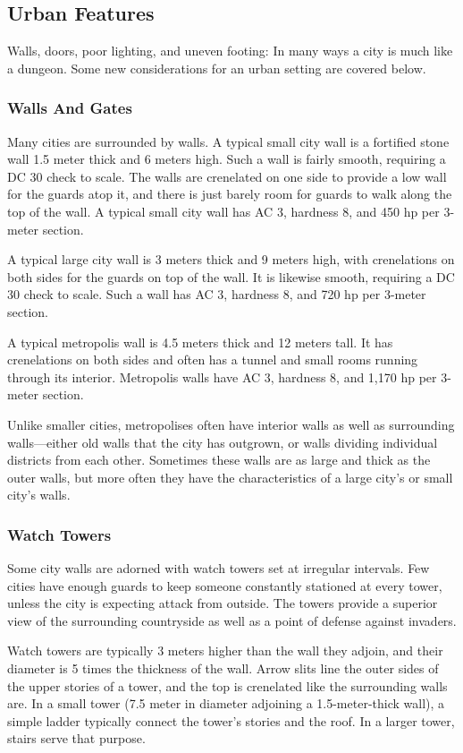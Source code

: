 \subsection{Urban Features}
Walls, doors, poor lighting, and uneven footing: In many ways a city is much like a dungeon. Some new considerations for an urban setting are covered below.

\subsubsection{Walls And Gates}
Many cities are surrounded by walls. A typical small city wall is a fortified stone wall 1.5 meter thick and 6 meters high. Such a wall is fairly smooth, requiring a DC 30  check to scale. The walls are crenelated on one side to provide a low wall for the guards atop it, and there is just barely room for guards to walk along the top of the wall. A typical small city wall has AC 3, hardness 8, and 450 hp per 3-meter section.

A typical large city wall is 3 meters thick and 9 meters high, with crenelations on both sides for the guards on top of the wall. It is likewise smooth, requiring a DC 30  check to scale. Such a wall has AC 3, hardness 8, and 720 hp per 3-meter section.

A typical metropolis wall is 4.5 meters thick and 12 meters tall. It has crenelations on both sides and often has a tunnel and small rooms running through its interior. Metropolis walls have AC 3, hardness 8, and 1,170 hp per 3-meter section.

Unlike smaller cities, metropolises often have interior walls as well as surrounding walls---either old walls that the city has outgrown, or walls dividing individual districts from each other. Sometimes these walls are as large and thick as the outer walls, but more often they have the characteristics of a large city's or small city's walls.

\subsubsection{Watch Towers}
Some city walls are adorned with watch towers set at irregular intervals. Few cities have enough guards to keep someone constantly stationed at every tower, unless the city is expecting attack from outside. The towers provide a superior view of the surrounding countryside as well as a point of defense against invaders.

Watch towers are typically 3 meters higher than the wall they adjoin, and their diameter is 5 times the thickness of the wall. Arrow slits line the outer sides of the upper stories of a tower, and the top is crenelated like the surrounding walls are. In a small tower (7.5 meter in diameter adjoining a 1.5-meter-thick wall), a simple ladder typically connect the tower's stories and the roof. In a larger tower, stairs serve that purpose.

